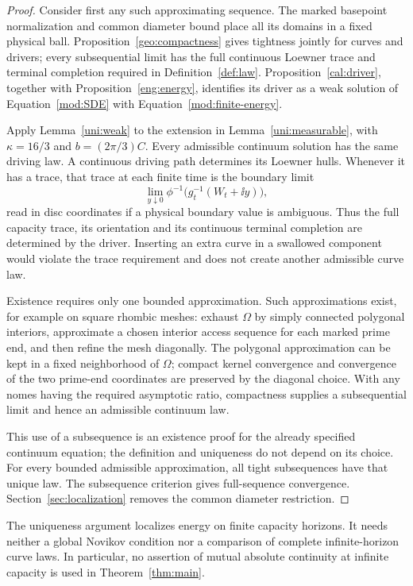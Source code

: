 \begin{proof}
Consider first any such approximating sequence. The marked
basepoint normalization and common diameter bound place all its
domains in a fixed physical ball. Proposition~\ref{geo:compactness}
gives tightness jointly for curves and drivers; every subsequential
limit has the full continuous Loewner trace and terminal completion
required in Definition~\ref{def:law}. Proposition~\ref{cal:driver},
together with Proposition~\ref{eng:energy}, identifies its driver as a
weak solution of Equation~\eqref{mod:SDE} with
Equation~\eqref{mod:finite-energy}.

Apply Lemma~\ref{uni:weak} to the extension in
Lemma~\ref{uni:measurable}, with
$\kappa=16/3$ and $b=(2\pi/3)C$. Every admissible continuum
solution has the same driving law. A continuous driving path
determines its Loewner hulls. Whenever it has a trace, that trace at
each finite time is the boundary limit
\[
 \lim_{y\downarrow0}\phi^{-1}
             \bigl(g_t^{-1}(W_t+\ii y)\bigr),
\]
read in disc coordinates if a physical boundary value is ambiguous.
Thus the full capacity trace, its orientation and its continuous
terminal completion are determined by the driver. Inserting an
extra curve in a swallowed component would violate the trace
requirement and does not create another admissible curve law.

Existence requires only one bounded approximation. Such
approximations exist, for example on square rhombic meshes: exhaust
$\Omega$ by simply connected polygonal interiors, approximate a
chosen interior access sequence for each marked prime end, and
then refine the mesh diagonally. The polygonal approximation can
be kept in a fixed neighborhood of $\Omega$; compact kernel
convergence and convergence of the two prime-end coordinates are
preserved by the diagonal choice. With any nomes having the
required asymptotic ratio, compactness supplies a subsequential
limit and hence an admissible continuum law.

This use of a subsequence is an existence proof for the already
specified continuum equation; the definition and uniqueness do not
depend on its choice. For every bounded admissible approximation,
all tight subsequences have that unique law. The subsequence
criterion gives full-sequence convergence. Section~\ref{sec:localization}
removes the common diameter restriction.
\end{proof}

\begin{remark}
The uniqueness argument localizes energy on finite capacity horizons.
It needs neither a global Novikov condition nor a comparison of
complete infinite-horizon curve laws. In particular, no assertion
of mutual absolute continuity at infinite capacity is used in
Theorem~\ref{thm:main}.
\end{remark}
